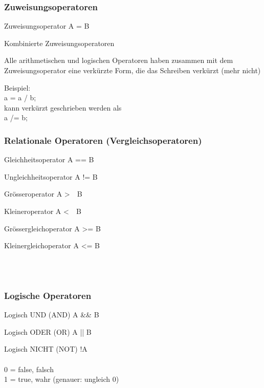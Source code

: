 				\begin{minipage}[t]{9 cm}
					\subsubsection{Zuweisungsoperatoren}
						\begin{compactitem}
							\item Zuweisungsoperator A = B
							\item Kombinierte Zuweisungsoperatoren
							\begin{compactitem}
								\item Alle arithmetischen und logischen Operatoren haben zusammen mit dem
								Zuweisungsoperator eine verkürzte Form, die das Schreiben verkürzt (mehr
								nicht)
								\item Beispiel:\\
								a = a / b;\\
								kann verkürzt geschrieben werden als\\
								a /= b;
							\end{compactitem}
						\end{compactitem}
				\end{minipage}
				\hspace*{0.5cm}
				\begin{minipage}[t]{6 cm}
					\subsubsection{Relationale Operatoren  (Vergleichsoperatoren)}
						\begin{compactitem}
							\item Gleichheitsoperator A == B
							\item Ungleichheitsoperator A != B
							\item Grösseroperator A \textgreater \ \ B
							\item Kleineroperator A \textless \ \ B
							\item Grössergleichoperator A \textgreater= B
							\item Kleinergleichoperator A \textless= B  
						\end{compactitem}	
				\end{minipage}\\\\
				\begin{minipage}[t]{9 cm}
					\subsubsection{Logische Operatoren}
						\begin{compactitem}
							\item Logisch UND (AND) A \&\& B
							\item Logisch ODER (OR) A || B
							\item Logisch NICHT (NOT) !A\\\\
							0 = false, falsch\\
							1 = true, wahr (genauer: ungleich 0)
						\end{compactitem}
				\end{minipage}

